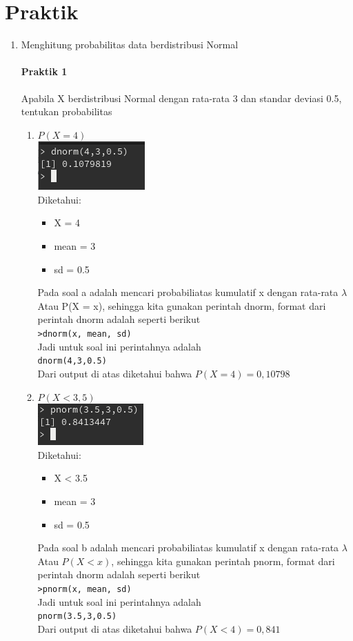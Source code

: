 \documentclass[a4paper,12pt]{article}
\begin{document}
\section{Praktik}
\begin{enumerate}[label=\textbf{\Alph*.}]
	\item Menghitung probabilitas  data berdistribusi Normal
	\paragraph{Praktik 1\\}
Apabila X berdistribusi Normal dengan rata-rata 3 dan standar deviasi 0.5, tentukan probabilitas

\begin{enumerate}[label=\alph*.]
  \item $P(X = 4)$\\
  \includegraphics[scale=1]{praka1a}\\
  Diketahui:
  \begin{itemize}
  	\item X = 4
  	\item mean = 3
  	\item sd = 0.5
  \end{itemize}
  Pada soal a adalah mencari probabiliatas kumulatif x dengan rata-rata $\lambda$
  Atau P(X = x), sehingga kita gunakan perintah dnorm, format dari perintah dnorm adalah seperti berikut\\
  \texttt{>dnorm(x, mean, sd)\\}
  Jadi untuk soal ini perintahnya adalah\\
  \texttt{dnorm(4,3,0.5)}\\
  Dari output di atas diketahui bahwa $P(X = 4) = 0,10798$
  
  \item $P (X < 3,5)$\\
  \includegraphics[scale=1]{praka1b}\\
  Diketahui:
  \begin{itemize}
  	\item X < 3.5
  	\item mean = 3
  	\item sd = 0.5
  \end{itemize}
  Pada soal b adalah mencari probabiliatas kumulatif x  dengan rata-rata $\lambda$
  Atau $P(X < x)$, sehingga kita gunakan perintah pnorm, format dari perintah dnorm adalah seperti berikut\\
  \texttt{>pnorm(x, mean, sd)\\}
  Jadi untuk soal ini perintahnya adalah\\
  \texttt{pnorm(3.5,3,0.5)}\\
  Dari output di atas diketahui bahwa $P(X < 4) = 0,841$
\end{enumerate}


\end{enumerate}
\end{document}
